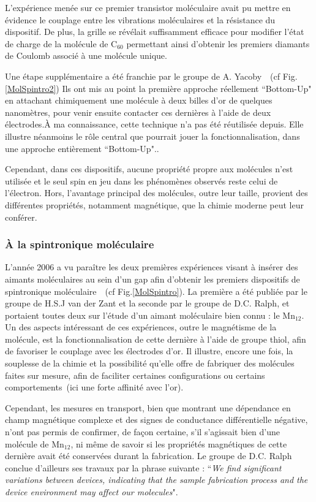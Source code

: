 L'expérience menée sur ce premier transistor moléculaire avait pu mettre en évidence le couplage entre les vibrations moléculaires et la résistance du dispositif. De plus, la grille se révélait suffisamment efficace pour modifier l'état de charge de la molécule de C$_{60}$ permettant ainsi d'obtenir les premiers diamants de Coulomb associé à une molécule unique.

Une étape supplémentaire a été franchie par le groupe de A. Yacoby~\cite{Dadosh2005}~(cf Fig.\ref{MolSpintro2}) Ils ont mis au point la première approche réellement ``Bottom-Up" en attachant chimiquement une molécule à deux billes d'or de quelques nanomètres, pour venir ensuite contacter ces dernières à l'aide de deux électrodes.\`A ma connaissance, cette technique n'a pas été réutilisée depuis. Elle illustre néanmoins le rôle central que pourrait jouer la fonctionnalisation, dans une approche entièrement ``Bottom-Up"..

Cependant, dans ces dispositifs, aucune propriété propre aux molécules n'est utilisée et le seul spin en jeu dans les phénomènes observés reste celui de l'électron. Hors, l'avantage principal des molécules, outre leur taille, provient des différentes propriétés, notamment magnétique, que la chimie moderne peut leur conférer.

\subsubsection*{\`A la spintronique moléculaire}

L'année 2006 a vu paraître les deux premières expériences visant à insérer des aimants moléculaires au sein d'un gap afin d'obtenir les premiers dispositifs de spintronique moléculaire~\cite{Heersche2006,Jo2006}~(cf Fig.\ref{MolSpintro}). La première a été publiée par le groupe de H.S.J van der Zant et la seconde par le groupe de D.C. Ralph, et portaient toutes deux sur l'étude d'un aimant moléculaire bien connu : le Mn$_{12}$. Un des aspects intéressant de ces expériences, outre le magnétisme de la molécule, est la fonctionnalisation de cette dernière à l'aide de groupe thiol, afin de favoriser le couplage avec les électrodes d'or. Il illustre, encore une fois, la souplesse de la chimie et la possibilité qu'elle offre de fabriquer des molécules faites sur mesure, afin de faciliter certaines configurations ou certains comportements~(ici une forte affinité avec l'or).  

Cependant, les mesures en transport, bien que montrant une dépendance en champ magnétique complexe et des signes de conductance différentielle négative, n'ont pas permis de confirmer, de façon certaine, s'il s'agissait bien d'une molécule de Mn$_{12}$, ni même de savoir si les propriétés magnétiques de cette dernière avait été conservées durant la fabrication. Le groupe de D.C. Ralph conclue d'ailleurs ses travaux par la phrase suivante : ``\textit{We find significant variations between devices, indicating that the sample fabrication process and the device environment may affect our molecules}".

